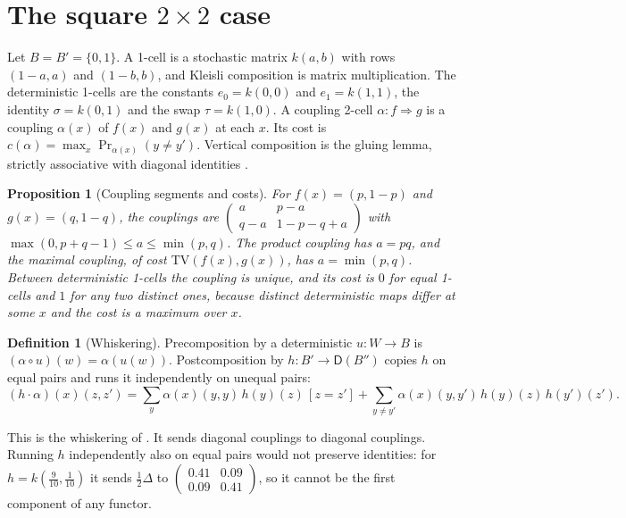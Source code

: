 \documentclass[11pt]{article}
\newtheorem{proposition}[theorem]{Proposition}
\theoremstyle{definition}
\newtheorem{definition}[theorem]{Definition}
\theoremstyle{remark}
\newcommand{\D}{\mathsf{D}}
\newcommand{\TV}{\mathrm{TV}}
\begin{document}
\section{The square $2\times2$ case}\label{sec:square}

Let $B=B'=\{0,1\}$. A 1-cell is a stochastic matrix $k(a,b)$ with rows $(1-a,a)$ and $(1-b,b)$, and
Kleisli composition is matrix multiplication. The deterministic 1-cells are the constants $e_0=k(0,0)$
and $e_1=k(1,1)$, the identity $\sigma=k(0,1)$ and the swap $\tau=k(1,0)$. A coupling 2-cell
$\alpha\colon f\Rightarrow g$ is a coupling $\alpha(x)$ of $f(x)$ and $g(x)$ at each $x$. Its cost is
$c(\alpha)=\max_x\Pr_{\alpha(x)}(y\ne y')$. Vertical composition is the gluing lemma, strictly associative
with diagonal identities \cite[Thm.~2.3]{Conditionals}.

\begin{proposition}[Coupling segments and costs]\label{prop:segment}
For $f(x)=(p,1-p)$ and $g(x)=(q,1-q)$, the couplings are
$\left(\begin{smallmatrix}a&p-a\\q-a&1-p-q+a\end{smallmatrix}\right)$ with
$\max(0,p+q-1)\le a\le\min(p,q)$. The product coupling has $a=pq$, and the maximal coupling, of cost
$\TV(f(x),g(x))$, has $a=\min(p,q)$. Between deterministic 1-cells the coupling is unique, and its cost is
$0$ for equal 1-cells and $1$ for any two distinct ones, because distinct deterministic maps differ at some
$x$ and the cost is a maximum over $x$.
\end{proposition}

\begin{definition}[Whiskering]\label{def:whisker}
Precomposition by a deterministic $u\colon W\to B$ is $(\alpha\circ u)(w)=\alpha(u(w))$. Postcomposition by
$h\colon B'\to\D(B'')$ copies $h$ on equal pairs and runs it independently on unequal pairs:
\[
(h\cdot\alpha)(x)(z,z')=\sum_y\alpha(x)(y,y)\,h(y)(z)\,[z=z']+\sum_{y\ne y'}\alpha(x)(y,y')\,h(y)(z)\,h(y')(z').
\]
\end{definition}

This is the whiskering of \cite[Thm.~2.3(ii)]{Conditionals}. It sends diagonal couplings to diagonal
couplings. Running $h$ independently also on equal pairs would not preserve identities: for
$h=k(\tfrac9{10},\tfrac1{10})$ it sends $\tfrac12\Delta$ to
$\left(\begin{smallmatrix}0.41&0.09\\0.09&0.41\end{smallmatrix}\right)$, so it cannot be the first component
of any functor.
\end{document}
